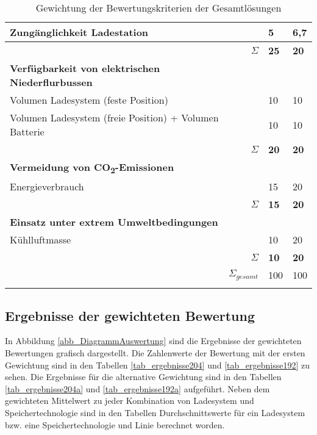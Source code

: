 \begin{table}
\begin{tabulary}{\linewidth}{LRLL}
		Zungänglichkeit Ladestation                              &                   & 5               & 6,7                         \\ \midrule
		                                                         &          $\Sigma$ & \textbf{25}     & \textbf{20}                 \\
		\textbf{Verfügbarkeit von elektrischen Niederflurbussen} &                   &                 &  \\
		Volumen Ladesystem (feste Position)                      &                   & 10              & 10                          \\
		Volumen Ladesystem (freie Position) + Volumen Batterie   &                   & 10              & 10                          \\ \midrule
		                                                         &          $\Sigma$ & \textbf{20}     & \textbf{20}                 \\
		\textbf{Vermeidung von CO\textsubscript{2}-Emissionen}   &                   &                 &  \\
		Energieverbrauch                                         &                   & 15              & 20                          \\ \midrule
		                                                         &          $\Sigma$ & \textbf{15}     & \textbf{20}                 \\
		\textbf{Einsatz unter extrem Umweltbedingungen}          &                   &                 &  \\
		Kühlluftmasse                                            &                   & 10              & 20                          \\ \midrule
		                                                         &          $\Sigma$ & \textbf{10}     & \textbf{20}                 \\ \midrule
		                                                         & $\Sigma_{gesamt}$ & 100             & 100 \\ \bottomrule
		                                                         &
	\end{tabulary}
	\caption{Gewichtung der Bewertungskriterien der Gesamtlösungen}
	\label{tab_bewertungskriterien}
\end{table} 

\subsection{Ergebnisse der gewichteten Bewertung}
In Abbildung \ref{abb_DiagrammAuswertung} sind die Ergebnisse der gewichteten Bewertungen grafisch dargestellt. Die Zahlenwerte der Bewertung mit der ersten Gewichtung sind in den Tabellen \ref{tab_ergebnisse204} und \ref{tab_ergebnisse192} zu sehen. Die Ergebnisse für die alternative Gewichtung sind in den Tabellen \ref{tab_ergebnisse204a} und \ref{tab_ergebnisse192a} aufgeführt. Neben dem gewichteten Mittelwert zu jeder Kombination von Ladesystem und Speichertechnologie sind in den Tabellen Durchschnittswerte für ein Ladesystem bzw. eine Speichertechnologie und Linie berechnet worden.

